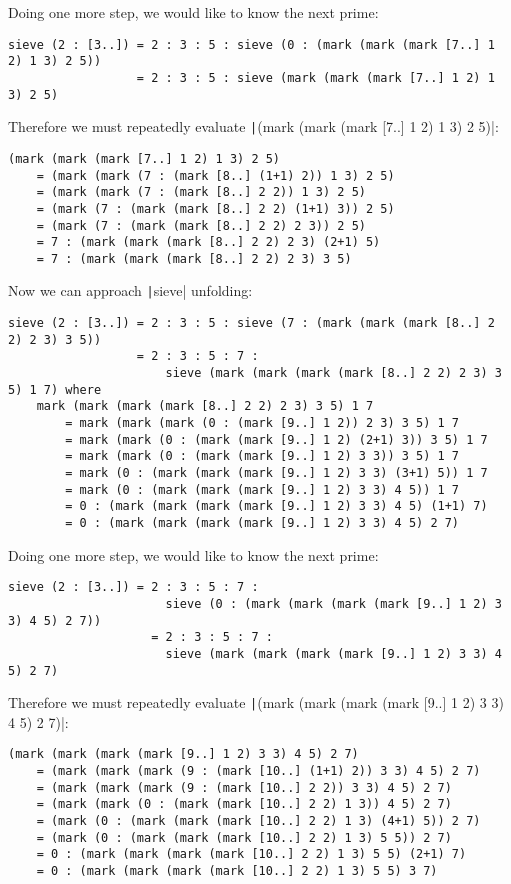 Doing one more step, we would like to know the next prime:
\begin{verbatim}
sieve (2 : [3..]) = 2 : 3 : 5 : sieve (0 : (mark (mark (mark [7..] 1 2) 1 3) 2 5))
                  = 2 : 3 : 5 : sieve (mark (mark (mark [7..] 1 2) 1 3) 2 5)
\end{verbatim}
Therefore we must repeatedly evaluate \texttt|(mark (mark (mark [7..] 1 2) 1 3) 2 5)|:
\begin{verbatim}
(mark (mark (mark [7..] 1 2) 1 3) 2 5)
    = (mark (mark (7 : (mark [8..] (1+1) 2)) 1 3) 2 5)
    = (mark (mark (7 : (mark [8..] 2 2)) 1 3) 2 5)
    = (mark (7 : (mark (mark [8..] 2 2) (1+1) 3)) 2 5)
    = (mark (7 : (mark (mark [8..] 2 2) 2 3)) 2 5)
    = 7 : (mark (mark (mark [8..] 2 2) 2 3) (2+1) 5)
    = 7 : (mark (mark (mark [8..] 2 2) 2 3) 3 5)
\end{verbatim}
Now we can approach \texttt|sieve| unfolding:
\begin{verbatim}
sieve (2 : [3..]) = 2 : 3 : 5 : sieve (7 : (mark (mark (mark [8..] 2 2) 2 3) 3 5))
                  = 2 : 3 : 5 : 7 : 
                      sieve (mark (mark (mark (mark [8..] 2 2) 2 3) 3 5) 1 7) where
    mark (mark (mark (mark [8..] 2 2) 2 3) 3 5) 1 7
        = mark (mark (mark (0 : (mark [9..] 1 2)) 2 3) 3 5) 1 7
        = mark (mark (0 : (mark (mark [9..] 1 2) (2+1) 3)) 3 5) 1 7
        = mark (mark (0 : (mark (mark [9..] 1 2) 3 3)) 3 5) 1 7
        = mark (0 : (mark (mark (mark [9..] 1 2) 3 3) (3+1) 5)) 1 7
        = mark (0 : (mark (mark (mark [9..] 1 2) 3 3) 4 5)) 1 7
        = 0 : (mark (mark (mark (mark [9..] 1 2) 3 3) 4 5) (1+1) 7)
        = 0 : (mark (mark (mark (mark [9..] 1 2) 3 3) 4 5) 2 7)
\end{verbatim}
Doing one more step, we would like to know the next prime:
\begin{verbatim}
sieve (2 : [3..]) = 2 : 3 : 5 : 7 : 
                      sieve (0 : (mark (mark (mark (mark [9..] 1 2) 3 3) 4 5) 2 7))
                    = 2 : 3 : 5 : 7 : 
                      sieve (mark (mark (mark (mark [9..] 1 2) 3 3) 4 5) 2 7)
\end{verbatim}
Therefore we must repeatedly evaluate \texttt|(mark (mark (mark (mark [9..] 1 2) 3 3) 4 5) 2 7)|:
\begin{verbatim}
(mark (mark (mark (mark [9..] 1 2) 3 3) 4 5) 2 7)
    = (mark (mark (mark (9 : (mark [10..] (1+1) 2)) 3 3) 4 5) 2 7)
    = (mark (mark (mark (9 : (mark [10..] 2 2)) 3 3) 4 5) 2 7)
    = (mark (mark (0 : (mark (mark [10..] 2 2) 1 3)) 4 5) 2 7)
    = (mark (0 : (mark (mark (mark [10..] 2 2) 1 3) (4+1) 5)) 2 7)
    = (mark (0 : (mark (mark (mark [10..] 2 2) 1 3) 5 5)) 2 7)
    = 0 : (mark (mark (mark (mark [10..] 2 2) 1 3) 5 5) (2+1) 7)
    = 0 : (mark (mark (mark (mark [10..] 2 2) 1 3) 5 5) 3 7)
\end{verbatim}
